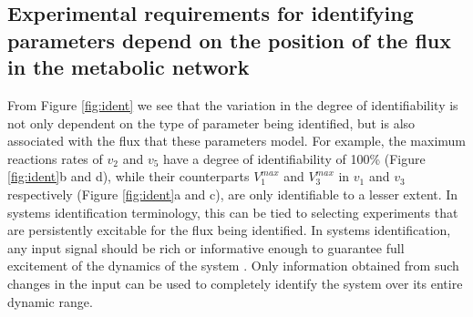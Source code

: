 \documentclass[10pt]{article}
\begin{document}
	
	\subsection{Experimental requirements for identifying parameters depend on the position of the flux in the metabolic network}\label{sec:experiment_type}		
	From Figure \ref{fig:ident} we see that the variation in the degree of identifiability is not only dependent on the type of parameter being identified, but is also associated with the flux that these parameters model. For example, the maximum reactions rates of $v_2$ and $v_5$ have a degree of identifiability of 100\% (Figure \ref{fig:ident}b and d), while their counterparts $V_1^{max}$ and $V_3^{max}$ in $v_1$ and $v_3$ respectively (Figure \ref{fig:ident}a and c), are only identifiable to a lesser extent.	
	In systems identification terminology, this can be tied to selecting experiments that are persistently excitable for the flux being identified. In systems identification, any input signal should be rich or informative enough to guarantee full excitement of the dynamics of the system \parencite{Ljung1994}. Only information obtained from such changes in the input can be used to completely identify the system over its entire dynamic range. %
	
\end{document}
